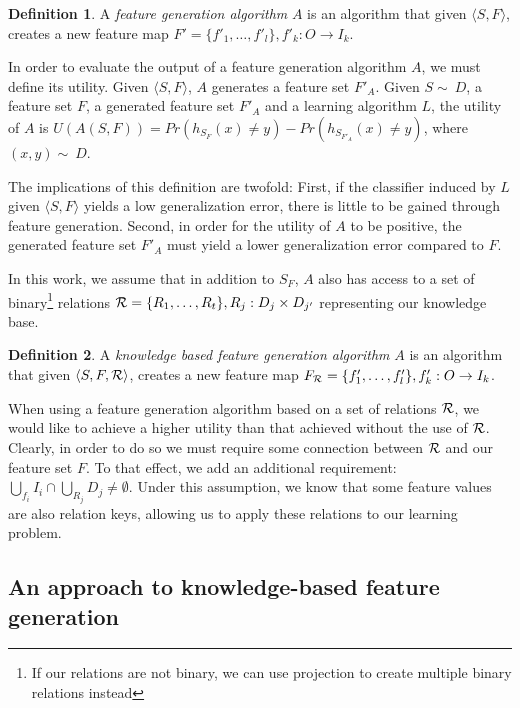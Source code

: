 \documentclass[twoside,11pt]{article}
\theoremstyle{definition}
\newtheorem{defn}{Definition}[section]
\begin{document}
\begin{defn}
	A \emph{feature generation algorithm} $A$ is an algorithm that given $\langle S,F\rangle$, creates a new feature map $F'=\{f'_{1},\ldots,f'_{l}\}, f'_{k}:O\rightarrow I_k$.
\end{defn}

In order to evaluate the output of a feature generation algorithm $A$, we must define its utility. Given $\langle S,F \rangle$, $A$ generates a feature set $F'_A$.
Given $S\sim\ D$, a feature set $F$, a generated feature set $F'_A$ and a learning algorithm $L$, the utility of $A$ is $U(A(S,F))=Pr(h_{S_F}(x)\neq y)-Pr(h_{S_{F'_A}}(x)\neq y)$, where $(x,y)\sim\ D$.

The implications of this definition are twofold: First, if the classifier induced by $L$ given  $\langle S,F \rangle$ yields a low generalization error, there is little to be gained through feature generation. Second, in order for the utility of $A$ to be positive, the generated feature set $F'_A$ must yield a lower generalization error compared to $F$.

In this work, we assume that in addition to $S_F$, $A$ also has access to a set of binary\footnote{If our relations are not binary, we can use projection to create multiple binary relations instead} relations ${\cal R}=\{R_{1},\ldots,R_{t}\}, R_j:D_j\times D_{j'}$ representing our knowledge base. 
\begin{defn}
	A \emph{knowledge based feature generation algorithm} $A$ is an algorithm that given $\langle S,F,{\cal R} \rangle$, creates a new feature map $F_{{\cal R}}=\{f'_{1},\ldots,f'_{l}\}, f'_{k}:O\rightarrow I_k$.
\end{defn}

When using a feature generation algorithm based on a set of relations ${\cal R}$, we would like to achieve a higher utility than that achieved without the use of ${\cal R}$. Clearly, in order to do so we must require some connection between ${\cal R}$ and our feature set $F$. To that effect, we add an additional requirement:  $\bigcup_{f_i} I_i \cap \bigcup_{R_j} D_j \neq \emptyset$. Under this assumption, we know that some feature values are also relation keys, allowing us to apply these relations to our learning problem.

\subsection{An approach to knowledge-based feature generation} \label{shallow_section}
\end{document}
